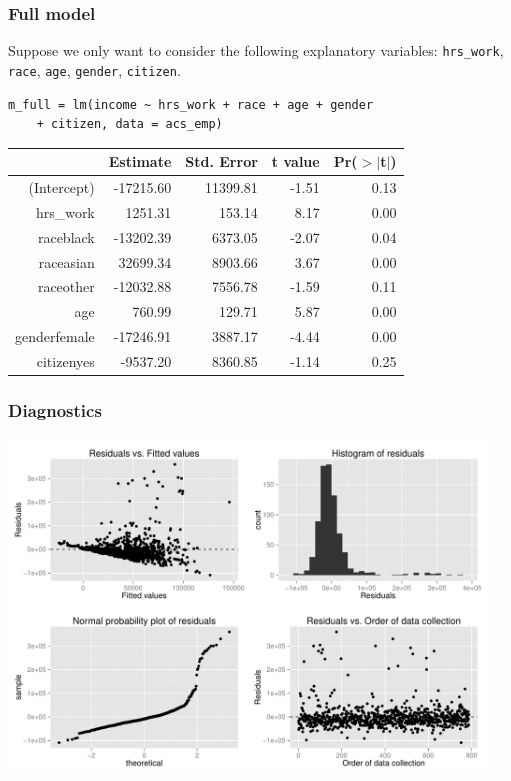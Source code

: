 \documentclass[slidestop,compress,mathserif,12pt,t,professionalfonts,xcolor=table]{beamer}
\begin{document}
\begin{frame}[fragile]
\frametitle{Full model}

Suppose we only want to consider the following explanatory variables: \texttt{hrs\_work}, \texttt{race}, \texttt{age}, \texttt{gender}, \texttt{citizen}.

{\footnotesize
\begin{Verbatim}[frame=single, formatcom=\color{blue}]
m_full = lm(income ~ hrs_work + race + age + gender 
    + citizen, data = acs_emp)
\end{Verbatim}
}

\pause

\begin{center}
{\small
\begin{tabular}{rrrrr}
  \hline
 & Estimate & Std. Error & t value & Pr($>$$|$t$|$) \\ 
  \hline
(Intercept) & -17215.60 & 11399.81 & -1.51 & 0.13 \\ 
  hrs\_work & 1251.31 & 153.14 & 8.17 & 0.00 \\ 
  raceblack & -13202.39 & 6373.05 & -2.07 & 0.04 \\ 
  raceasian & 32699.34 & 8903.66 & 3.67 & 0.00 \\ 
  raceother & -12032.88 & 7556.78 & -1.59 & 0.11 \\ 
  age & 760.99 & 129.71 & 5.87 & 0.00 \\ 
  genderfemale & -17246.91 & 3887.17 & -4.44 & 0.00 \\ 
  citizenyes & -9537.20 & 8360.85 & -1.14 & 0.25 \\ 
   \hline
\end{tabular}
}
\end{center}

\end{frame}


\begin{frame}[fragile]
\frametitle{Diagnostics}

\vspace{-0.5cm}


\begin{center}
\includegraphics[width=0.95\textwidth]{figures/acs/diag}
\end{center}


\end{frame}
\end{document}
